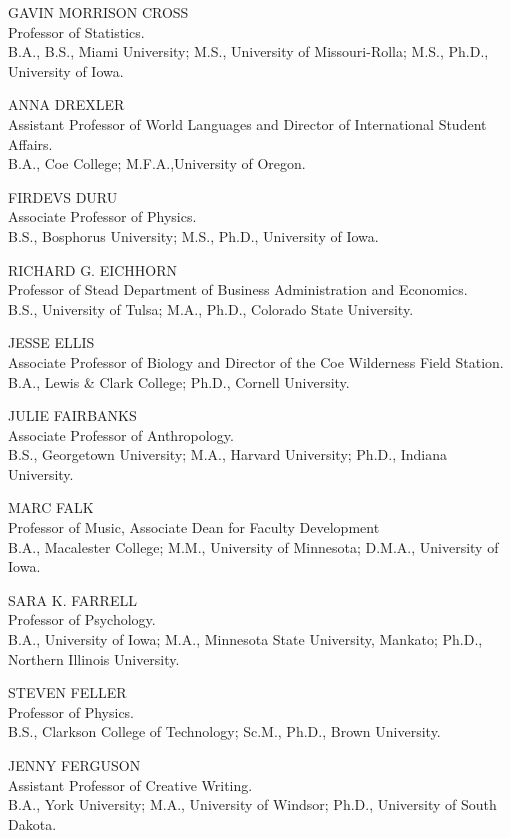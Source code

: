 \documentclass[
  letterpaper,
]{scrbook}
\begin{document}
GAVIN MORRISON CROSS\\
Professor of Statistics.\\
B.A., B.S., Miami University; M.S., University of Missouri-Rolla; M.S.,
Ph.D., University of Iowa.

ANNA DREXLER\\
Assistant Professor of World Languages and Director of International
Student Affairs.\\
B.A., Coe College; M.F.A.,University of Oregon.

FIRDEVS DURU\\
Associate Professor of Physics.\\
B.S., Bosphorus University; M.S., Ph.D., University of Iowa.

RICHARD G. EICHHORN\\
Professor of Stead Department of Business Administration and
Economics.\\
B.S., University of Tulsa; M.A., Ph.D., Colorado State University.

JESSE ELLIS\\
Associate Professor of Biology and Director of the Coe Wilderness Field
Station.\\
B.A., Lewis \& Clark College; Ph.D., Cornell University.

JULIE FAIRBANKS\\
Associate Professor of Anthropology.\\
B.S., Georgetown University; M.A., Harvard University; Ph.D., Indiana
University.

MARC FALK\\
Professor of Music, Associate Dean for Faculty Development\\
B.A., Macalester College; M.M., University of Minnesota; D.M.A.,
University of Iowa.

SARA K. FARRELL\\
Professor of Psychology.\\
B.A., University of Iowa; M.A., Minnesota State University, Mankato;
Ph.D., Northern Illinois University.

STEVEN FELLER\\
Professor of Physics.\\
B.S., Clarkson College of Technology; Sc.M., Ph.D., Brown University.

JENNY FERGUSON\\
Assistant Professor of Creative Writing.\\
B.A., York University; M.A., University of Windsor; Ph.D., University of
South Dakota.
\end{document}
